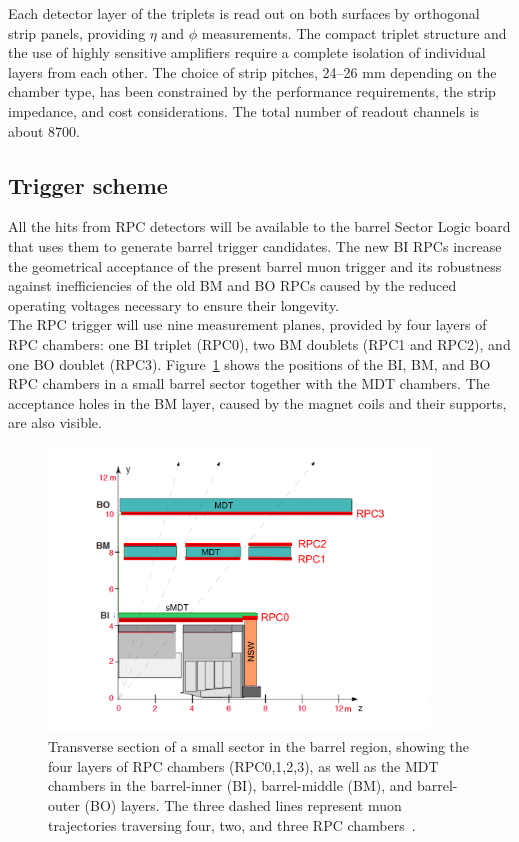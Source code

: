 Each detector layer of the triplets is read out on both surfaces by orthogonal strip panels,
providing $\eta$ and $\phi$ measurements. The compact triplet structure and the use of highly
sensitive amplifiers require a complete isolation of individual layers from each other. The
choice of strip pitches, 24–26 mm depending on the chamber type, has been constrained
by the performance requirements, the strip impedance, and cost considerations. The total
number of readout channels is about 8700.

\subsection {Trigger scheme}
All the hits from RPC detectors will be available to the barrel Sector Logic board that uses them to
generate barrel trigger candidates. The new BI RPCs increase the geometrical acceptance
of the present barrel muon trigger and its robustness against inefficiencies of the old BM
and BO RPCs caused by the reduced operating voltages necessary to ensure their longevity.\\
The RPC trigger will use nine measurement planes, provided by four layers of RPC chambers:
one BI triplet (RPC0), two BM doublets (RPC1 and RPC2), and one BO doublet (RPC3).
Figure~\ref{fig:trig_schemeXY} shows the positions of the BI, BM, and BO RPC chambers in a small 
barrel sector
together with the MDT chambers. The acceptance holes in the BM layer, caused by the
magnet coils and their supports, are also visible.
\begin{figure}[!h]
	\centering
	\includegraphics[width=0.9\textwidth]{Chapters/CH3/figures/trig_schemeXY}
	\caption{Transverse section of a small sector in the barrel region, showing the four layers of RPC chambers (RPC0,1,2,3), as well as the MDT chambers in the barrel-inner (BI), barrel-middle (BM), and barrel-outer (BO) layers. The three dashed lines represent muon trajectories traversing four, two, and three RPC chambers~\cite{TDR}.}
	\label{fig:trig_schemeXY}
\end{figure}
